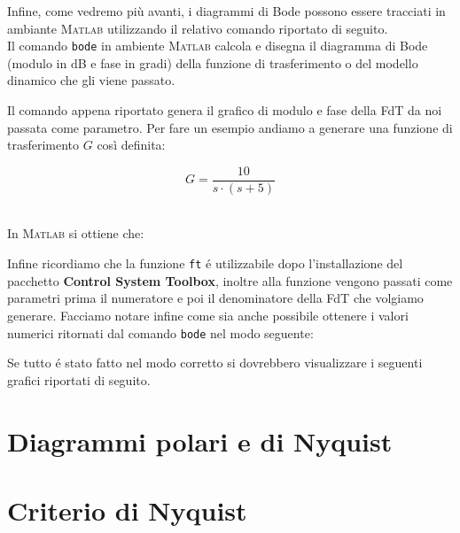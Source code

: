 \documentclass[../main.tex]{subfiles}
\begin{document}
Infine, come vedremo più avanti, i diagrammi di Bode possono essere tracciati in ambiante \textsc{Matlab} utilizzando il relativo comando riportato di seguito.\\

Il comando \texttt{bode} in ambiente \textsc{Matlab} calcola e disegna il diagramma di Bode (modulo in dB e fase in gradi) della funzione di trasferimento o del modello dinamico che gli viene passato.\\



\hspace{0.5cm}


Il comando appena riportato genera il grafico di modulo e fase della FdT da noi passata come parametro. Per fare un esempio andiamo a generare una funzione di trasferimento $G$ così definita:

\[ G = \frac{10}{s \cdot (s+5) }\]\

In \textsc{Matlab} si ottiene che:\\


\hspace{0.5cm}

Infine ricordiamo che la funzione \texttt{ft} é utilizzabile dopo l'installazione del pacchetto \textbf{Control System Toolbox}, inoltre alla funzione vengono passati come parametri prima il numeratore e poi il denominatore della FdT che volgiamo generare. Facciamo notare infine come sia anche possibile ottenere i valori numerici ritornati dal comando \texttt{bode} nel modo seguente:\\


\hspace{0.5cm}


Se tutto é stato fatto nel modo corretto si dovrebbero visualizzare i seguenti grafici riportati di seguito.

 


\clearpage
\thispagestyle{empty}
\vspace*{7cm}
\section{Diagrammi polari e di Nyquist}
\vspace*{1.5cm}











\clearpage
\thispagestyle{empty}
\vspace*{7cm}
\section{Criterio di Nyquist}
\vspace*{1.5cm}
\end{document}
